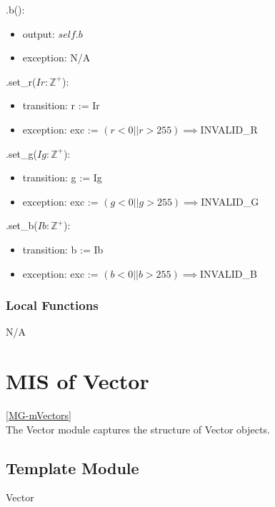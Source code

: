 \documentclass[12pt, titlepage]{article}
\begin{document}
\noindent .b():
\begin{itemize}
	\item output: $self.b$
	\item exception: N/A
\end{itemize} 

\noindent .set\_r($Ir: \mathbb{Z}^+$):
\begin{itemize}
	\item transition: r := Ir
	\item exception: exc := $(r < 0 || r > 255) \implies $INVALID\_R \\
\end{itemize}

\noindent .set\_g($Ig: \mathbb{Z}^+$):
\begin{itemize}
	\item transition: g := Ig
	\item exception: exc := $(g < 0 || g > 255) \implies $INVALID\_G \\
\end{itemize}

\noindent .set\_b($Ib: \mathbb{Z}^+$):
\begin{itemize}
	\item transition: b := Ib
	\item exception: exc := $(b < 0 || b > 255) \implies $INVALID\_B \\
\end{itemize}

\subsubsection{Local Functions}
N/A

\newpage

\section{MIS of Vector} \ref{MG-mVectors} \\
The Vector module captures the structure of Vector objects.

\subsection{Template Module}
Vector
\end{document}
